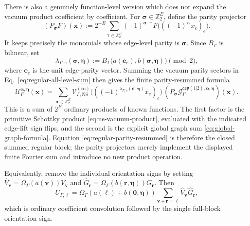 \documentclass[11pt]{article}
\newcommand{\NS}{\mathrm{NS}}
\newcommand{\osp}{\mathfrak{osp}(1|2)}
\newcommand{\G}{\mathcal G}
\newcommand{\V}{\mathcal V}
\newcommand{\U}{\mathcal U}
\begin{document}
There is also a genuinely function-level version which does not expand the
vacuum product coefficient by coefficient.  For
\(\bm\sigma\in\mathbb Z_2^E\), define the parity projector
\begin{equation}
 (P_{\bm\sigma}F)(\bm x)
 :=2^{-E}\sum_{\bm\tau\in\mathbb Z_2^E}
 (-1)^{\bm\sigma\cdot\bm\tau}
 F\bigl(((-1)^{\tau_e}x_e)_e\bigr).
 \label{eq:edge-parity-projector}
\end{equation}
It keeps precisely the monomials whose edge-level parity is
\(\bm\sigma\).  Since \(B_\Gamma\) is bilinear, set
\begin{equation}
 \lambda_{\Gamma,e}(\bm\sigma,\bm\eta)
 :=B_\Gamma\bigl(a(\bm e_e),b(\bm\sigma,\bm\eta)\bigr)
 \pmod2,
 \label{eq:regular-sign-flip-vector}
\end{equation}
where \(\bm e_e\) is the unit edge-parity vector.  Summing the vacuum
parity sectors in Eq.~\eqref{eq:regular-all-level-sum} then gives the finite
parity-resummed formula
\begin{equation}
\boxed{
 \U_\Gamma^{\bm\alpha,\bm\eta}(\bm x)
 =\sum_{\bm\sigma\in\mathbb Z_2^E}
 \V_{\Gamma,\NS}^{(\infty)}
 \bigl(((-1)^{\lambda_{\Gamma,e}(\bm\sigma,\bm\eta)}x_e)_e\bigr)
 \,(P_{\bm\sigma}
 \G_\Gamma^{\osp,\bm\alpha,\bm\eta})(\bm x).}
 \label{eq:regular-parity-resummed}
\end{equation}
This is a sum of \(2^E\) ordinary products of known functions.  The first
factor is the primitive Schottky product
\eqref{eq:ns-vacuum-product}, evaluated with the indicated edge-lift sign
flips, and the second is the explicit global graph sum
\eqref{eq:global-graph-formula}.  Equation
\eqref{eq:regular-parity-resummed} is therefore the closed summed regular
block; the parity projectors merely implement the displayed finite Fourier
sum and introduce no new product operation.

Equivalently, remove the individual orientation signs by setting
\(\widehat V_{\bm v}=\Omega_\Gamma(a(\bm v))V_{\bm v}\) and
\(\widehat G_{\bm r}=\Omega_\Gamma(b(\bm r,\bm\eta))G_{\bm r}\).  Then
\begin{equation}
 U_{\Gamma,\bm\ell}
 =\Omega_\Gamma(a(\bm\ell)+b(\bm0,\bm\eta))
  \sum_{\bm v+\bm r=\bm\ell}
  \widehat V_{\bm v}\widehat G_{\bm r},
 \label{eq:orientation-free-convolution}
\end{equation}
which is ordinary coefficient convolution followed by the single full-block
orientation sign.
\end{document}
